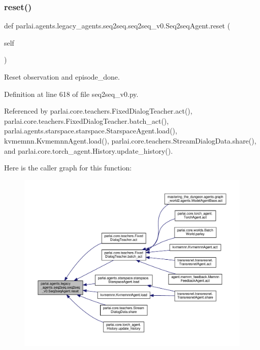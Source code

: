\subsubsection{\texorpdfstring{reset()}{reset()}}
{\footnotesize\ttfamily def parlai.\+agents.\+legacy\+\_\+agents.\+seq2seq.\+seq2seq\+\_\+v0.\+Seq2seq\+Agent.\+reset (\begin{DoxyParamCaption}\item[{}]{self }\end{DoxyParamCaption})}

\begin{DoxyVerb}Reset observation and episode_done.\end{DoxyVerb}
 

Definition at line 618 of file seq2seq\+\_\+v0.\+py.



Referenced by parlai.\+core.\+teachers.\+Fixed\+Dialog\+Teacher.\+act(), parlai.\+core.\+teachers.\+Fixed\+Dialog\+Teacher.\+batch\+\_\+act(), parlai.\+agents.\+starspace.\+starspace.\+Starspace\+Agent.\+load(), kvmemnn.\+Kvmemnn\+Agent.\+load(), parlai.\+core.\+teachers.\+Stream\+Dialog\+Data.\+share(), and parlai.\+core.\+torch\+\_\+agent.\+History.\+update\+\_\+history().

Here is the caller graph for this function\+:
\nopagebreak
\begin{figure}[H]
\begin{center}
\leavevmode
\includegraphics[width=350pt]{classparlai_1_1agents_1_1legacy__agents_1_1seq2seq_1_1seq2seq__v0_1_1Seq2seqAgent_a56d246fd8b6bcf41726181c17cdc2762_icgraph}
\end{center}
\end{figure}
\mbox{\label{classparlai_1_1agents_1_1legacy__agents_1_1seq2seq_1_1seq2seq__v0_1_1Seq2seqAgent_ae76435bf7acee9501188de47c0ba6991}} 
